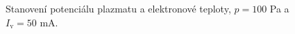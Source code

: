 \documentclass[a4paper,12pt]{article}
\begin{document}
\begin{figure}[h]
	\centering
	\begin{subfigure}[b]{.49\textwidth}
		\centering
	\end{subfigure}
	\begin{subfigure}[b]{.49\textwidth}
		\centering
	\end{subfigure}
	\caption{Stanovení potenciálu plazmatu a elektronové teploty, $p = 100$ \si{\pascal} a $I_\text{v} = 50$ \si{\milli\ampere}.}
	\label{data2}
\end{figure}
\end{document}
